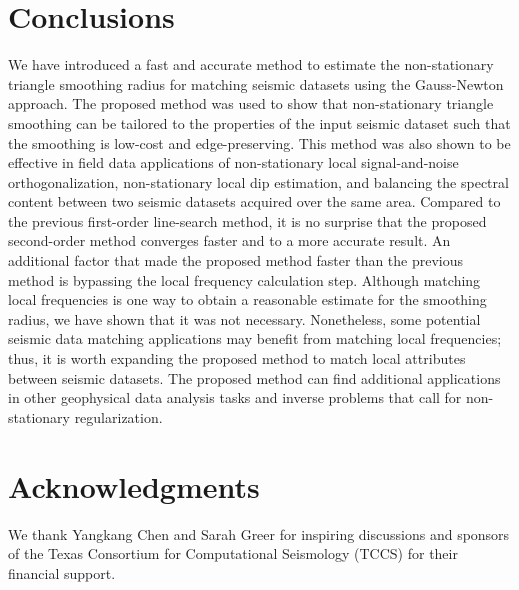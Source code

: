 

\section{Conclusions}
We have introduced a fast and accurate method to estimate the non-stationary triangle smoothing radius for matching seismic datasets using the Gauss-Newton approach. The proposed method was used to show that non-stationary triangle smoothing can be tailored to the properties of the input seismic dataset such that the smoothing is low-cost and edge-preserving. This method was also shown to be effective in field data applications of non-stationary local signal-and-noise orthogonalization, non-stationary local dip estimation, and balancing the spectral content between two seismic datasets acquired over the same area. Compared to the previous first-order line-search method, it is no surprise that the proposed second-order method converges faster and to a more accurate result. 
An additional factor that made the proposed method faster than the previous method is bypassing the local frequency calculation step. Although matching local frequencies is one way to obtain a reasonable estimate for the smoothing radius, we have shown that it was not necessary. Nonetheless, some potential seismic data matching applications may benefit from matching local frequencies; thus, it is worth expanding the proposed method to match local attributes between seismic datasets. The proposed method can find additional applications in other geophysical data analysis tasks and inverse problems that call for non-stationary regularization. 


\section{Acknowledgments}
We thank Yangkang Chen and Sarah Greer for inspiring discussions and sponsors of the Texas Consortium for Computational Seismology (TCCS) for their financial support.


\onecolumn
 



